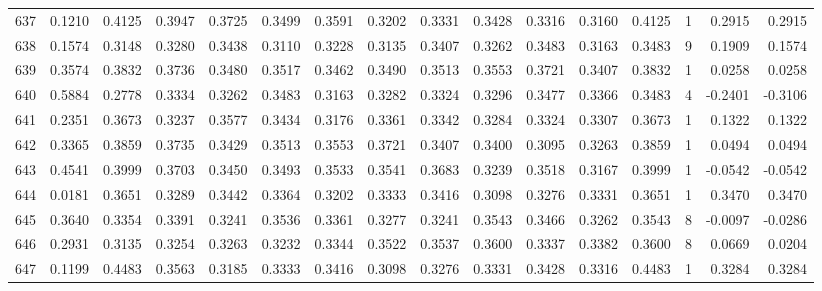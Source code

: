 \begin{tabular}{lrrrrrrrrrrrrrrr}
637 &      0.1210 &  0.4125 &  0.3947 &  0.3725 &  0.3499 &  0.3591 &  0.3202 &  0.3331 &  0.3428 &  0.3316 &   0.3160 &     0.4125 &      1 &                    0.2915 &                     0.2915 \\
638 &      0.1574 &  0.3148 &  0.3280 &  0.3438 &  0.3110 &  0.3228 &  0.3135 &  0.3407 &  0.3262 &  0.3483 &   0.3163 &     0.3483 &      9 &                    0.1909 &                     0.1574 \\
639 &      0.3574 &  0.3832 &  0.3736 &  0.3480 &  0.3517 &  0.3462 &  0.3490 &  0.3513 &  0.3553 &  0.3721 &   0.3407 &     0.3832 &      1 &                    0.0258 &                     0.0258 \\
640 &      0.5884 &  0.2778 &  0.3334 &  0.3262 &  0.3483 &  0.3163 &  0.3282 &  0.3324 &  0.3296 &  0.3477 &   0.3366 &     0.3483 &      4 &                   -0.2401 &                    -0.3106 \\
641 &      0.2351 &  0.3673 &  0.3237 &  0.3577 &  0.3434 &  0.3176 &  0.3361 &  0.3342 &  0.3284 &  0.3324 &   0.3307 &     0.3673 &      1 &                    0.1322 &                     0.1322 \\
642 &      0.3365 &  0.3859 &  0.3735 &  0.3429 &  0.3513 &  0.3553 &  0.3721 &  0.3407 &  0.3400 &  0.3095 &   0.3263 &     0.3859 &      1 &                    0.0494 &                     0.0494 \\
643 &      0.4541 &  0.3999 &  0.3703 &  0.3450 &  0.3493 &  0.3533 &  0.3541 &  0.3683 &  0.3239 &  0.3518 &   0.3167 &     0.3999 &      1 &                   -0.0542 &                    -0.0542 \\
644 &      0.0181 &  0.3651 &  0.3289 &  0.3442 &  0.3364 &  0.3202 &  0.3333 &  0.3416 &  0.3098 &  0.3276 &   0.3331 &     0.3651 &      1 &                    0.3470 &                     0.3470 \\
645 &      0.3640 &  0.3354 &  0.3391 &  0.3241 &  0.3536 &  0.3361 &  0.3277 &  0.3241 &  0.3543 &  0.3466 &   0.3262 &     0.3543 &      8 &                   -0.0097 &                    -0.0286 \\
646 &      0.2931 &  0.3135 &  0.3254 &  0.3263 &  0.3232 &  0.3344 &  0.3522 &  0.3537 &  0.3600 &  0.3337 &   0.3382 &     0.3600 &      8 &                    0.0669 &                     0.0204 \\
647 &      0.1199 &  0.4483 &  0.3563 &  0.3185 &  0.3333 &  0.3416 &  0.3098 &  0.3276 &  0.3331 &  0.3428 &   0.3316 &     0.4483 &      1 &                    0.3284 &                     0.3284 \\

\end{tabular}
